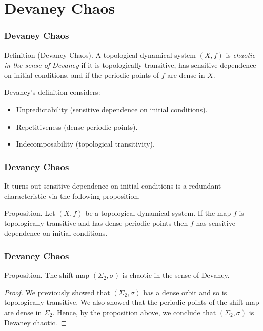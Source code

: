 \documentclass{beamer}
\begin{document}
\section{Devaney Chaos}
\begin{frame}
    \frametitle{Devaney Chaos}
    \begin{block}{Definition (Devaney Chaos).}
        A topological dynamical system $(X, f)$ is \emph{chaotic in the sense of Devaney} if it is topologically transitive, has sensitive dependence on initial conditions, and if the periodic points of $f$ are dense in $X$.
    \end{block}
    \vspace{0.5cm}
    Devaney's definition considers:
    \begin{itemize}
        \item Unpredictability (sensitive dependence on initial conditions).
        \item Repetitiveness (dense periodic points).
        \item Indecomposability (topological transitivity).
    \end{itemize}
\end{frame}

\begin{frame}
    \frametitle{Devaney Chaos}
    It turns out sensitive dependence on initial conditions is a redundant characteristic via the following proposition.
    \vspace{0.5cm}
    \begin{block}{Proposition.}
        Let $(X, f)$ be a topological dynamical system. If the map $f$ is topologically transitive and has dense periodic points then $f$ has sensitive dependence on initial conditions. \cite{bbcds} \cite{glasner-weiss}
    \end{block}
\end{frame}

\begin{frame}
    \frametitle{Devaney Chaos}
    \begin{block}{Proposition.}
        The shift map $(\Sigma_2, \sigma)$ is chaotic in the sense of Devaney.
        \begin{proof}
            We previously showed that $(\Sigma_2, \sigma)$ has a dense orbit and so is topologically transitive. We also showed that the periodic points of the shift map are dense in $\Sigma_2$. Hence, by the proposition above, we conclude that $(\Sigma_2, \sigma)$ is Devaney chaotic.
        \end{proof}
    \end{block}
\end{frame}
\end{document}
